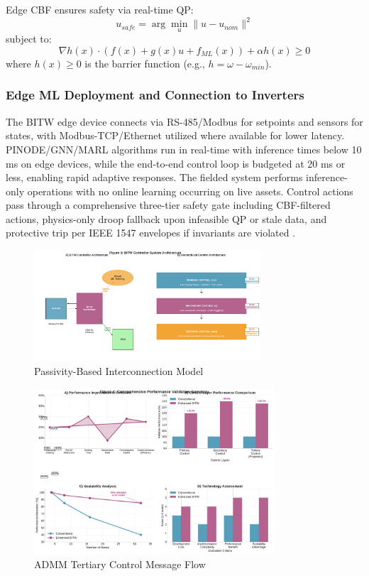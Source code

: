 \documentclass[12pt]{article}
\begin{document}
Edge CBF ensures safety via real-time QP:
\begin{equation}
u_{safe} = \arg\min_u \|u - u_{nom}\|^2
\end{equation}
subject to:
\begin{equation}
\nabla h(x) \cdot (f(x) + g(x)u + f_{ML}(x)) + \alpha h(x) \geq 0
\end{equation}
where $h(x) \geq 0$ is the barrier function (e.g., $h = \omega - \omega_{min}$).

\subsubsection{Edge ML Deployment and Connection to Inverters}

The BITW edge device connects via RS-485/Modbus for setpoints and sensors for states, with Modbus-TCP/Ethernet utilized where available for lower latency. PINODE/GNN/MARL algorithms run in real-time with inference times below 10 ms on edge devices, while the end-to-end control loop is budgeted at 20 ms or less, enabling rapid adaptive responses. The fielded system performs inference-only operations with no online learning occurring on live assets. Control actions pass through a comprehensive three-tier safety gate including CBF-filtered actions, physics-only droop fallback upon infeasible QP or stale data, and protective trip per IEEE 1547 envelopes if invariants are violated \cite{ieee1547}.

\begin{figure}[H]
\centering
\includegraphics[width=0.75\textwidth]{figure3_system_architecture.pdf}
\caption{Passivity-Based Interconnection Model}
\end{figure}

\begin{figure}[H]
\centering
\includegraphics[width=0.8\textwidth]{figure4_performance_summary.pdf}
\caption{ADMM Tertiary Control Message Flow}
\end{figure}
\end{document}
